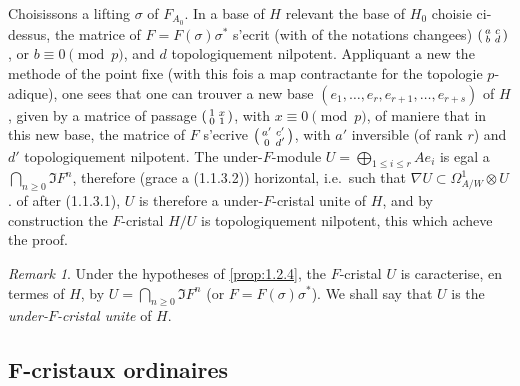 \documentclass[12pt,a4paper]{article}
\theoremstyle{plain}
\theoremstyle{definition}
\theoremstyle{remark}
\newtheorem{remark}[theorem]{Remark}
\begin{document}
Choisissons a lifting $\sigma$ of $F_{A_0}$. In a base of $H$ relevant the base of $H_0$ choisie ci-dessus, the matrice of $F = F(\sigma)\sigma^*$ s'ecrit (with of the notations changees) $\begin{psmallmatrix} a & c \\ b & d \end{psmallmatrix}$, or $b \equiv 0 \pmod{p}$, and $d$ topologiquement nilpotent. Appliquant a new the methode of the point fixe (with this fois a map contractante for the topologie $p$-adique), one sees that one can trouver a new base $(e_1, \ldots, e_r, e_{r+1}, \ldots, e_{r+s})$ of $H$, given by a matrice of passage $\begin{psmallmatrix} 1 & x \\ 0 & 1 \end{psmallmatrix}$, with $x \equiv 0 \pmod{p}$, of maniere that in this new base, the matrice of $F$ s'ecrive $\begin{psmallmatrix} a' & c' \\ 0 & d' \end{psmallmatrix}$, with $a'$ inversible (of rank $r$) and $d'$ topologiquement nilpotent. The under-$F$-module $U = \bigoplus_{1 \leq i \leq r} Ae_i$ is egal a $\bigcap_{n \geq 0} \Im F^n$, therefore (grace a (1.1.3.2)) horizontal, i.e.\ such that $\nabla U \subset \Omega^1_{A/W} \otimes U$. of after (1.1.3.1), $U$ is therefore a under-$F$-cristal unite of $H$, and by construction the $F$-cristal $H/U$ is topologiquement nilpotent, this which acheve the proof.

\begin{remark}\label{rem:1.2.5}
Under the hypotheses of \ref{prop:1.2.4}, the $F$-cristal $U$ is caracterise, en termes of $H$, by $U = \bigcap_{n \geq 0} \Im F^n$ (or $F = F(\sigma)\sigma^*$). We shall say that $U$ is the \emph{under-$F$-cristal unite} of $H$.
\end{remark}

\subsection{F-cristaux ordinaires}

\subsubsection{}
\end{document}
